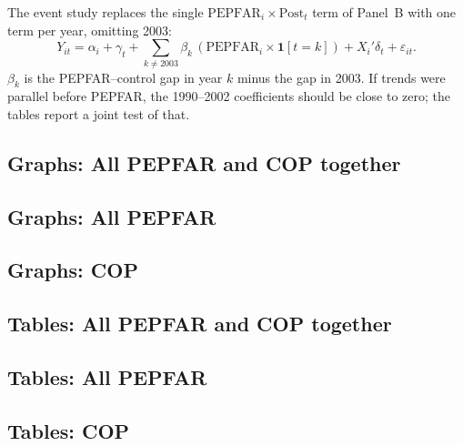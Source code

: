 \documentclass[11pt]{article}
\begin{document}
The event study replaces the single $\text{PEPFAR}_i \times \text{Post}_t$ term of
Panel~B with one term per year, omitting 2003:
\begin{equation*}
Y_{it} = \alpha_i + \gamma_t + \sum_{k \neq 2003} \beta_k\,
         (\text{PEPFAR}_i \times \mathbf{1}[t = k]) + X_i' \delta_t + \varepsilon_{it}.
\end{equation*}
$\beta_k$ is the PEPFAR--control gap in year $k$ minus the gap in 2003. If trends were
parallel before PEPFAR, the 1990--2002 coefficients should be close to zero; the tables
report a joint test of that.

\subsection{Graphs: All PEPFAR and COP together}


\subsection{Graphs: All PEPFAR}


\subsection{Graphs: COP}


\subsection{Tables: All PEPFAR and COP together}


\subsection{Tables: All PEPFAR}


\clearpage

\subsection{Tables: COP}


\end{document}
